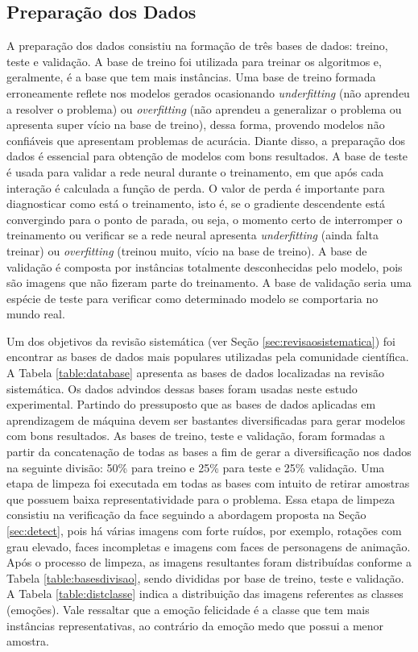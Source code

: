 \subsection{Preparação dos Dados}\label{prepdados}
A preparação dos dados consistiu na formação de três bases de dados: treino, teste e validação. A base de treino foi utilizada para treinar os algoritmos e, geralmente, é a base que tem mais instâncias. Uma base de treino formada erroneamente reflete nos modelos gerados ocasionando \textit{underfitting} (não aprendeu a resolver o problema) ou \textit{overfitting} (não aprendeu a generalizar o problema ou apresenta super vício na base de treino), dessa forma, provendo modelos não confiáveis que apresentam problemas de acurácia. Diante disso, a preparação dos dados é essencial para obtenção de modelos com bons resultados. A base de teste é usada para validar a rede neural durante o treinamento, em que após cada interação é calculada a função de perda. O valor de perda é importante para diagnosticar como está o treinamento, isto é, se o gradiente descendente está convergindo para o ponto de parada, ou seja, o momento certo de interromper o treinamento ou verificar se a rede neural apresenta \textit{underfitting} (ainda falta treinar) ou \textit{overfitting} (treinou muito, vício na base de treino). A base de validação é composta por instâncias totalmente desconhecidas pelo modelo, pois são imagens que não fizeram parte do treinamento. A base de validação seria uma espécie de teste para verificar como determinado modelo se comportaria no mundo real.  

Um dos objetivos da revisão sistemática (ver Seção \ref{sec:revisaosistematica}) foi encontrar as bases de dados mais populares utilizadas pela comunidade científica. A Tabela \ref{table:database} apresenta as bases de dados localizadas na revisão sistemática. Os dados advindos dessas bases foram usadas neste estudo experimental. Partindo do pressuposto que as bases de dados aplicadas em aprendizagem de máquina devem ser bastantes diversificadas para gerar modelos com bons resultados. As bases de treino, teste e validação, foram formadas a partir da concatenação de todas as bases a fim de gerar a diversificação nos dados na seguinte divisão: 50\% para treino e 25\% para teste e 25\% validação. Uma etapa de limpeza foi executada em todas as bases com intuito de retirar amostras que possuem baixa representatividade para o problema. Essa etapa de limpeza consistiu na verificação da face seguindo a abordagem proposta na Seção \ref{sec:detect}, pois há várias imagens com forte ruídos, por exemplo, rotações com grau elevado, faces incompletas e imagens com faces de personagens de animação. Após o processo de limpeza, as imagens resultantes foram distribuídas conforme a Tabela \ref{table:basesdivisao}, sendo divididas por base de treino, teste e validação. A Tabela \ref{table:distclasse} indica a distribuição das imagens referentes as classes (emoções). Vale ressaltar que a emoção felicidade é a classe que tem mais instâncias representativas, ao contrário da emoção medo que possui a menor amostra.


